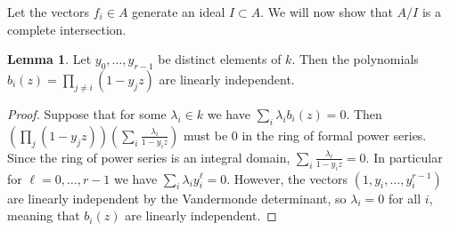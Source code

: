 \documentclass{amsart}
\numberwithin{equation}{section}
\theoremstyle{definition}
\newtheorem{lemma}[theorem]{Lemma}
\begin{document}
Let the vectors $f_i \in A$ generate an ideal $I \subset A$.  We will now show that $A/I$ is a complete intersection.

\begin{lemma}\label{lem:vand}Let $y_0, \ldots, y_{r - 1}$ be distinct elements of $k$.  Then the polynomials $b_i(z) = \prod_{j \neq i} (1 - y_j z)$ are linearly independent.
\end{lemma}
\begin{proof} 
Suppose that for some $\lambda_i \in k$ we have $\sum_i \lambda_ib_i(z)=0$.  Then $\left(\prod_j (1-y_jz)\right)\left(\sum_i \frac{\lambda_i}{1-y_iz}\right)$ must be $0$ in the ring of formal power series. Since the ring of power series is an integral domain, $\sum_i \frac{\lambda_i}{1-y_iz}=0$. In particular for $\ell=0,\dots,r-1$ we have $\sum_i \lambda_iy_i^\ell=0$.  However, the vectors $(1,y_i,\dots,y_i^{r-1})$ are linearly independent by the Vandermonde determinant, so $\lambda_i=0$ for all $i$, meaning that $b_i(z)$ are linearly independent.
\end{proof}
\end{document}
